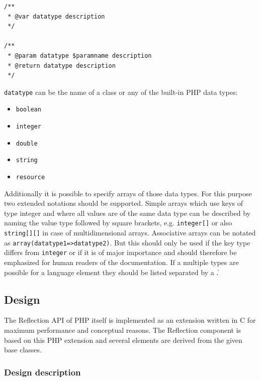 \documentclass[10pt,final,a4paper,oneside]{article}
\begin{document}
\begin{verbatim}
/**
 * @var datatype description
 */

/**
 * @param datatype $paramname description
 * @return datatype description
 */
\end{verbatim}

\noindent
\verb|datatype| can be the name of a class
or any of the built-in PHP data types:

\begin{itemize}
	\item \verb|boolean|
	\item \verb|integer|
	\item \verb|double|
	\item \verb|string|
	\item \verb|resource|
\end{itemize}

Additionally it is possible to specify arrays of those
data types.
For this purpose two extended notations should be supported.
Simple arrays which use keys of type integer and
where all values are of the same data type
can be described by naming the value type followed by square brackets,
e.g. \verb|integer[]| or also \verb|string[][]|
in case of multidimensional arrays.
Associative arrays can be notated as
\verb|array(datatype1=>datatype2)|.
But this should only be used
if the key type differs from \verb|integer|
or if it is of major importance
and should therefore be emphasized
for human readers of the documentation. 
If a multiple types are possible for a language element
they should be listed separated by a \|.


\subsection{Design}\label{subsec:ReflectionDesign}
%
%

The Reflection API of PHP \cite{PHP5Reflection}
itself is implemented as an extension written in C
for maximum performance and conceptual reasons.
The Reflection component is based on this PHP extension
and several elements are derived from the given base classes.

\subsubsection{Design description}
\end{document}
